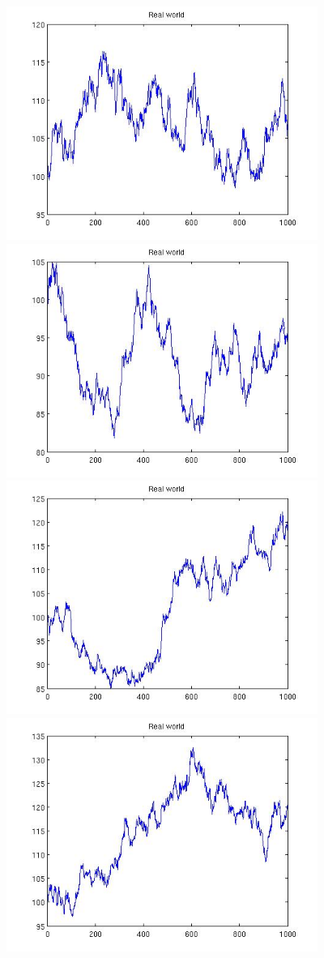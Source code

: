 \documentclass[12pt]{article}
\begin{document}
\begin{center}
    \includegraphics[width=4in]{real4.jpg}
    \includegraphics[width=4in]{real5.jpg}
    \includegraphics[width=4in]{real6.jpg}
    \includegraphics[width=4in]{real7.jpg}

\end{center}
\end{document}
